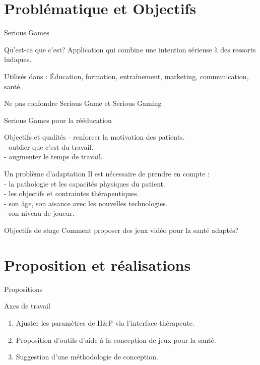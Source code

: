 \documentclass{beamer}
\begin{document}
	\section{Problématique et Objectifs}
		\begin{frame}{Serious Games}
			\begin{block}{Qu'est-ce que c'est?}
				Application qui combine une intention sérieuse à des ressorts ludiques.
			\end{block}\pause
			\begin{exampleblock}{Utilisés dans :}
				Éducation, formation, entraînement, marketing, communication, santé.
			\end{exampleblock}	\pause
			\begin{alertblock}{Ne pas confondre}
				Serious Game et Serious Gaming
			\end{alertblock}
		\end{frame}
	
		\begin{frame}{Serious Games pour la rééducation}
			\begin{exampleblock}{Objectifs et qualités}
				- renforcer la motivation des patients.\\
				- oublier que c'est du travail. \\
				- augmenter le temps de travail.
			\end{exampleblock}\pause
			\begin{alertblock}{Un problème d'adaptation}
			Il est nécessaire de prendre en compte :\\
					- la pathologie et les capacités physiques du patient.\\
					- les objectifs et contraintes thérapeutiques.\\
					- son âge, son aisance avec les nouvelles technologies.\\
					- son niveau de joueur.
			\end{alertblock}
		\end{frame}
	
		\begin{frame}{Objectifs de stage}		
			\large{Comment proposer des jeux vidéo pour la santé adaptés?}
		\end{frame}
		
	\section{Proposition et réalisations}	
		\begin{frame}{Propositions}
			\begin{block}{Axes de travail}			
				\begin{enumerate}
					\item Ajuster les paramètres de H\&P via l'interface thérapeute.
					\item Proposition d'outils d'aide à la conception de jeux pour la santé.
					\item Suggestion d'une méthodologie de conception.
				\end{enumerate}
			\end{block}
		\end{frame}		
			
\end{document}
